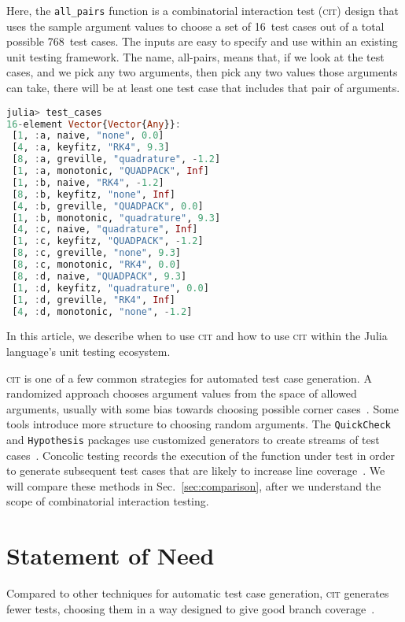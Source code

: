 \documentclass{juliacon}
\newcommand{\cit}{\textsc{cit}\xspace}
\begin{document}
Here, the \verb|all_pairs| function is a combinatorial interaction test (\cit) design that uses the sample argument values to choose a set of 16~test cases out of a total possible 768~test cases. The inputs are easy to specify and use within an existing unit testing framework. The name, all-pairs, means that, if we look at the test cases, and we pick any two arguments, then pick any two values those arguments can take, there will be at least one test case that includes that pair of arguments.
\begin{lstlisting}[language=Julia]
julia> test_cases
16-element Vector{Vector{Any}}:
 [1, :a, naive, "none", 0.0]
 [4, :a, keyfitz, "RK4", 9.3]
 [8, :a, greville, "quadrature", -1.2]
 [1, :a, monotonic, "QUADPACK", Inf]
 [1, :b, naive, "RK4", -1.2]
 [8, :b, keyfitz, "none", Inf]
 [4, :b, greville, "QUADPACK", 0.0]
 [1, :b, monotonic, "quadrature", 9.3]
 [4, :c, naive, "quadrature", Inf]
 [1, :c, keyfitz, "QUADPACK", -1.2]
 [8, :c, greville, "none", 9.3]
 [8, :c, monotonic, "RK4", 0.0]
 [8, :d, naive, "QUADPACK", 9.3]
 [1, :d, keyfitz, "quadrature", 0.0]
 [1, :d, greville, "RK4", Inf]
 [4, :d, monotonic, "none", -1.2]
 \end{lstlisting}
In this article, we describe when to use \cit and how to use \cit within the Julia language's unit testing ecosystem.

\vskip 6pt
\cit is one of a few common strategies for automated test case generation. A randomized approach chooses argument values from the space of allowed arguments, usually with some bias towards choosing possible corner cases~\cite{Lampropoulos2020-sd,Arcuri2012-az}. Some tools introduce more structure to choosing random arguments. The \texttt{QuickCheck} and \texttt{Hypothesis} packages use customized generators to create streams of test cases~\cite{loscher2018automating}. Concolic testing records the execution of the function under test in order to generate subsequent test cases that are likely to increase line coverage~\cite{King1976-jt,Wang2018-xh,vira2019}. We will compare these methods in Sec.~\ref{sec:comparison}, after we understand the scope of combinatorial interaction testing.

\section{Statement of Need}\label{sec:statement-of-need}

Compared to other techniques for automatic test case generation, \cit generates fewer tests, choosing them in a way designed to give good branch coverage~\cite{Nie2011-yl,Grindal2005-su,Kuhn2010-ak}.
\end{document}
